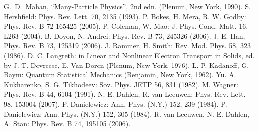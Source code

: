 \documentclass[a4paper,10pt]{jsarticle}
\begin{document}
%

\begin{thebibliography}{99}
 G.~D.~Mahan, ``Many-Particle Physics'', 2nd edn. (Plenum, New York, 1990).
 S. Hershfield: Phys. Rev. Lett. 70, 2135 (1993).
 P. Bokes, H. Mera, R. W. Godby: Phys. Rev. B 72 165425 (2005).
 P. Coleman, W. Mao: J. Phys. Cond. Matt. 16, L263 (2004).
 B. Doyon, N. Andrei: Phys. Rev. B 73, 245326 (2006).
 J. E. Han, Phys. Rev. B 73, 125319 (2006).
 J. Rammer, H. Smith: Rev. Mod. Phys. 58, 323 (1986).
 D. C. Langreth: in Linear and Nonlinear Electron Transport in Solids, ed. by J. T. Devreese, E. Van Doren (Plenum, New York, 1976).
 L. P. Kadanoff, G. Baym: Quantum Statistical Mechanics (Benjamin, New York, 1962).
 Yu. A. Kukharenko, S. G. Tikhodeev: Sov. Phys. JETP 56, 831 (1982).
 M. Wagner: Phys. Rev. B 44, 6104 (1991).
 N. E. Dahlen, R. van Leeuwen: Phys. Rev. Lett. 98, 153004 (2007).
 P. Danielewicz: Ann. Phys. (N.Y.) 152, 239 (1984).
 P. Danielewicz: Ann. Phys. (N.Y.) 152, 305 (1984).
 R. van Leeuwen, N. E. Dahlen, A. Stan: Phys. Rev. B 74, 195105 (2006).

\end{thebibliography}
\end{document}

